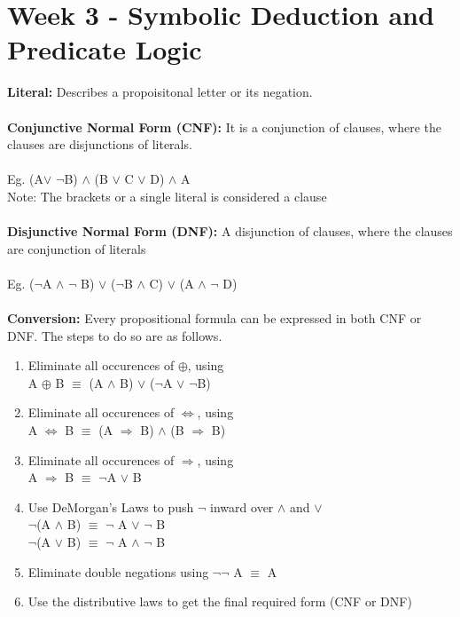 \documentclass[a4paper,10pt]{article}
\begin{document}
\section*{Week 3 - Symbolic Deduction and  Predicate Logic}
\noindent \textcolor{RoyalPurple}{\textbf{Literal:}} Describes a propoisitonal letter or its negation.\\ \\ 
\noindent \textcolor{RoyalPurple}{\textbf{Conjunctive Normal Form (CNF):}} It is a conjunction of clauses, where the clauses are disjunctions of literals. \\ \\
\indent Eg. (A$\lor$ $\neg$B) $\land$ (B $\lor$ C $\lor$ D) $\land$ A \\
\indent Note: The brackets or a single literal is considered a clause \\\\
\noindent \textcolor{RoyalPurple}{\textbf{Disjunctive Normal Form (DNF):}} A disjunction of clauses, where the clauses are conjunction of literals \\ \\
\indent Eg. ($\neg$A $\land$ $\neg$ B) $\lor$ ($\neg$B $\land$ C) $\lor$ (A $\land$ $\neg$ D) \\ \\
\noindent \textcolor{RoyalPurple}{\textbf{Conversion:}} Every propositional formula can be expressed in both CNF or DNF. The steps to do so are as follows.
\begin{enumerate}
	\item \textcolor{RoyalPurple}{Eliminate all occurences of $\oplus$, using} \\
	A $\oplus$ B $\equiv$ (A $\land$ B) $\lor$ ($\neg$A $\lor$ $\neg$B) 
	\item \textcolor{RoyalPurple}{Eliminate all occurences of $\Leftrightarrow$, using} \\
	A $\Leftrightarrow$ B $\equiv$ (A $\Rightarrow$ B) $\land$ (B $\Rightarrow$ B)
	\item \textcolor{RoyalPurple}{Eliminate all occurences of $\Rightarrow$, using} \\
	A $\Rightarrow$ B $\equiv$ $\neg$A $\lor$ B
	\item \textcolor{RoyalPurple}{Use DeMorgan's Laws to push $\neg$ inward over $\land$ and $\lor$} \\
	$\neg$(A $\land$ B) $\equiv$ $\neg$ A $\lor$ $\neg$ B \\
	$\neg$(A $\lor$ B) $\equiv$ $\neg$ A $\land$ $\neg$ B
	\item \textcolor{RoyalPurple}{Eliminate double negations using}
	$\neg \neg$ A $\equiv$ A
	\item \textcolor{RoyalPurple}{Use the distributive laws to get the final required form (CNF or DNF)}
\end{enumerate}
\end{document}

